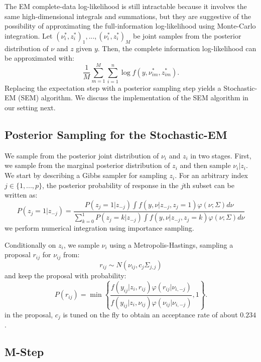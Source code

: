 \documentclass{article}
\begin{document}
The EM complete-data log-likelihood is still intractable because it involves the same high-dimensional integrals and summations, but they are suggestive of the possibility of approximating the full-information log-likelihood using Monte-Carlo integration. Let $(\nu_i^*,z_i^*)_1,...,(\nu_{i}^*,z_i^*)_M$ be joint samples from the posterior distribution of $\nu$ and $z$ given $y$. Then, the complete information log-likelihood can be approximated with:
$$
\frac{1}{M}\sum_{m=1}^{M}\sum_{i=1}^{n} \log f(y, \nu_{im}^{*}, z_{im}^*).
$$
Replacing the expectation step with a posterior sampling step yields a Stochastic-EM  (SEM) algorithm. We discuss the implementation of the SEM algorithm in our setting next. 


\subsection{Posterior Sampling for the Stochastic-EM}
We sample from the posterior joint distribution of $\nu_i$ and $z_i$ in two stages. First, we sample from the marginal posterior distribution of $z_i$ and then sample $\nu_i | z_i$. We start by describing a Gibbs sampler for sampling $z_i$. For an arbitrary index $j\in\{1,...,p\}$, the posterior probability of response in the $j$th subset can be written as:
$$
P(z_{j} =1 | z_{-j} ) = \frac{P(z_j = 1 | z_{-j}) \int f(y, \nu | z_{-j}, z_{j} = 1) \varphi(\nu;\Sigma)d\nu}
{\sum_{k=0}^{1}P(z_j = k| z_{-j}) \int f(y, \nu | z_{-j}, z_{j} = k) \varphi(\nu;\Sigma)d\nu}
$$
we perform numerical integration using importance sampling. 

Conditionally on $z_i$, we sample $\nu_i$ using a Metropolis-Hastings, sampling a proposal $r_{ij}$ for $\nu_{ij}$ from:
$$
r_{ij} \sim N(\nu_{ij}, c_j\Sigma_{j,j})
$$
and keep the proposal with probability:
$$
P(r_{ij}) = \min\left\{
\frac{f(y_{ij} | z_i, r_{ij}) \varphi(r_{ij} | \nu_{i, -j})}{f(y_{ij}| z_i, \nu_{ij}) \varphi(\nu_{ij} | \nu_{i,-j})}
, 1\right\}.
$$
in the proposal, $c_j$ is tuned on the fly to obtain an acceptance rate of about $0.234$. 

\break
\subsection{M-Step}
\end{document}
